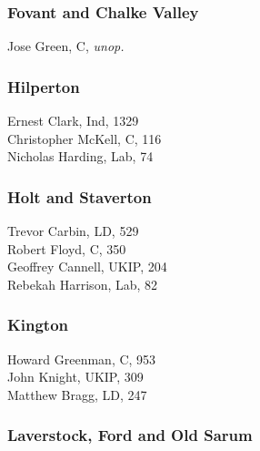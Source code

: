 \documentclass[a4paper,openany,10pt]{book}
\begin{document}
\subsubsection*{Fovant and Chalke Valley}



Jose Green, C, \emph{unop.}\\


\subsubsection*{Hilperton}



Ernest Clark, Ind, 1329\\
Christopher McKell, C, 116\\
Nicholas Harding, Lab, 74\\


\subsubsection*{Holt and Staverton}



Trevor Carbin, LD, 529\\
Robert Floyd, C, 350\\
Geoffrey Cannell, UKIP, 204\\
Rebekah Harrison, Lab, 82\\


\subsubsection*{Kington}



Howard Greenman, C, 953\\
John Knight, UKIP, 309\\
Matthew Bragg, LD, 247\\


\subsubsection*{Laverstock, Ford and Old Sarum}

\end{document}

